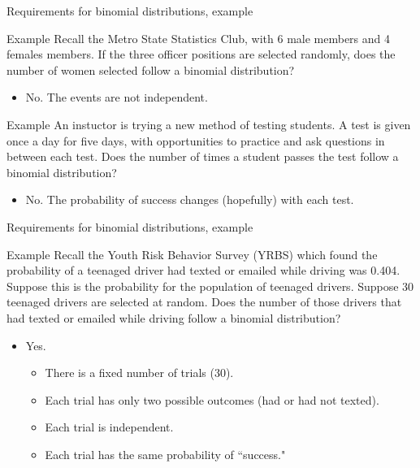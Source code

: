 \documentclass[xcolor=table, handout]{beamer}
\begin{document}
\begin{frame}{Requirements for binomial distributions, example}
\begin{exampleblock}{Example}
Recall the Metro State Statistics Club, with 6 male members and 4 females members. If the three officer positions are selected randomly, does the number of women selected follow a binomial distribution?
\begin{itemize}
\pause\item No. The events are not independent.
\end{itemize}
\end{exampleblock}
\pause
\begin{exampleblock}{Example}
An instuctor is trying a new method of testing students. A test is given once a day for five days, with opportunities to practice and ask questions in between each test. Does the number of times a student passes the test follow a binomial distribution?
\begin{itemize}
\pause\item No. The probability of success changes (hopefully) with each test.
\end{itemize}
\end{exampleblock}

\end{frame}

\begin{frame}{Requirements for binomial distributions, example}
\begin{exampleblock}{Example}
Recall the Youth Risk Behavior Survey (YRBS) which found the probability of a teenaged driver had texted or emailed while driving was 0.404. Suppose this is the probability for the population of teenaged drivers. Suppose 30 teenaged drivers are selected at random. Does the number of those drivers that had texted or emailed while driving follow a binomial distribution?
\begin{itemize}
\pause\item Yes. 
\begin{itemize}
\item There is a fixed number of trials (30).
\item Each trial has only two possible outcomes (had or had not texted).
\item Each trial is independent.
\item Each trial has the same probability of ``success."
\end{itemize}
\end{itemize}
\end{exampleblock}

\end{frame}
\end{document}
